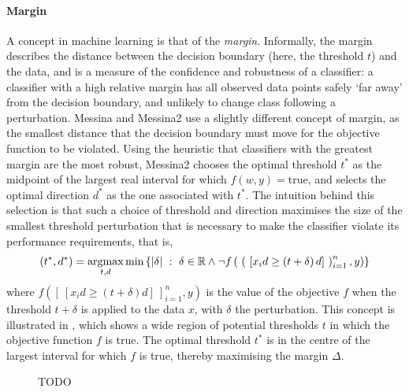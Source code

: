 \documentclass[dissertation.tex]{subfiles}
\begin{document}
\paragraph{Margin}
A concept in machine learning is that of the \emph{margin}.  Informally, the margin describes the distance between the decision boundary (here, the threshold $t$) and the data, and is a measure of the confidence and robustness of a classifier: a classifier with a high relative margin has all observed data points safely `far away' from the decision boundary, and unlikely to change class following a perturbation.  Messina and Messina2 use a slightly different concept of margin, as the smallest distance that the decision boundary must move for the objective function to be violated.  Using the heuristic that classifiers with the greatest margin are the most robust, Messina2 chooses the optimal threshold $t^*$ as the midpoint of the largest real interval for which $f(w, y) = \mathrm{true}$, and selects the optimal direction $d^*$ as the one associated with $t^*$.  The intuition behind this selection is that such a choice of threshold and direction maximises the size of the smallest threshold perturbation that is necessary to make the classifier violate its performance requirements, that is, 
\begin{equation}
(t^*, d^*) = \operatorname*{\arg\!\max}_{t,d} \mathrm{min}\left\{ \vert\delta\vert~:~\delta \in \mathbb{R} \wedge \neg f\left(~\left(~\left[x_i d \geq \left(t + \delta\right)d\right]~\right)_{i=1}^n, y\right) \right\}
\end{equation}
where $f([~[x_i d \geq (t + \delta)d]~]_{i=1}^n, y)$ is the value of the objective $f$ when the threshold $t + \delta$ is applied to the data $x$, with $\delta$ the perturbation.  This concept is illustrated in , which shows a wide region of potential thresholds $t$ in which the objective function $f$ is true.  The optimal threshold $t^*$ is in the centre of the largest interval for which $f$ is true, thereby maximising the margin $\Delta$.

\begin{figure}[!htbp]
\centering
\def\svgwidth{\linewidth} 

\caption[]{TODO}\label{fig:mess-thresh-2}
\end{figure}
\end{document}

